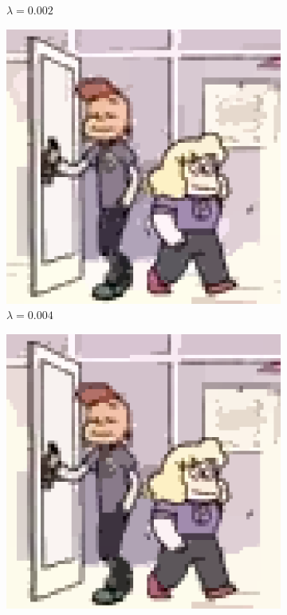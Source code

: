 \documentclass[10pt,twocolumn,letterpaper]{article}
\begin{document}
\begin{figure}
\begin{subfigure}{.48\linewidth}
\caption{$\lambda = 0.002$}
\end{subfigure}
\begin{subfigure}{.48\linewidth}
\includegraphics[width=\linewidth]{gradminResults/gradmin_sadylars_large_0004.png}
\caption{$\lambda = 0.004$}
\end{subfigure}
\begin{subfigure}{.48\linewidth}
\includegraphics[width=\linewidth]{gradminResults/gradmin_sadylars_large_0008.png}

\end{subfigure}
\end{figure}
\end{document}
